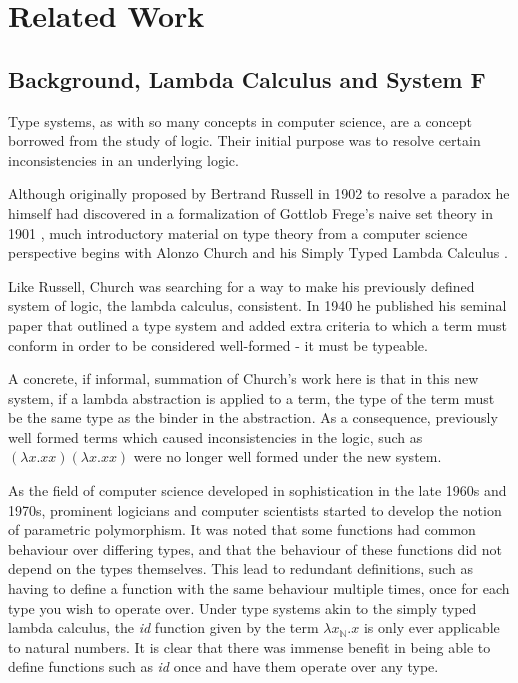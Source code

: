 \documentclass{ProgressReport}[2020/09/15]
\begin{document}
        \chapter{Related Work}

        \section{Background, Lambda Calculus and System F}

          Type systems, as with so many concepts in computer science,
          are a concept borrowed from the study of logic. Their initial
          purpose was to resolve certain inconsistencies in an
          underlying logic. 
      
          Although originally proposed by Bertrand Russell in 1902 to
          resolve a paradox he himself had discovered in a formalization of
          Gottlob Frege's naive set theory in 1901 \cite{Russell1901}, much
          introductory material on type theory from a computer science
          perspective begins with Alonzo Church and his Simply Typed
          Lambda Calculus \cite{church1940}.
          
          Like Russell, Church was searching for a way to make his
          previously defined system of logic, the lambda calculus,
          consistent. In 1940 he published his seminal paper that outlined a
          type system and added extra criteria to which a term must
          conform in order to be considered well-formed - it must be typeable.
      
          A concrete, if informal, summation of Church's work here is that
          in this new system, if a lambda abstraction is applied to a term,
          the type of the term must be the same type as the binder in the
          abstraction. As a consequence, previously well formed terms which
          caused inconsistencies in the logic, such as
          $ (\lambda x.xx)(\lambda x.xx)  $
          were no longer well formed under the new system.
      
          As the field of computer science developed in sophistication in
          the late 1960s and 1970s, prominent logicians and computer
          scientists started to develop the notion of parametric
          polymorphism. It was noted that some functions had common
          behaviour over differing types, and that the behaviour of these
          functions did not depend on the types themselves. This lead to
          redundant definitions, such as having to define a function with the
          same behaviour multiple times, once for each type you wish to
          operate over. Under type systems akin to the simply typed lambda
          calculus, the \emph{id} function given by the term $\lambda
          x_{\mathbb{N}}.x $ is only ever applicable to natural numbers. It
          is clear that there was immense benefit in being able to define
          functions such as \emph{id} once and have them operate over any type.
      
\end{document}
